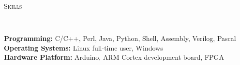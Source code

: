 \documentclass[a4paper, 12pt]{article}
\newenvironment{changemargin}[2]{%
  \begin{list}{}{%
      \setlength{\topsep}{0pt}%
      \setlength{\leftmargin}{#1}%
      \setlength{\rightmargin}{#2}%
      \setlength{\listparindent}{\parindent}%
      \setlength{\itemindent}{\parindent}%
      \setlength{\parsep}{\parskip}%
    }%
  \item[]}{\end{list}
}
\newcommand{\lineover}{
  \begin{changemargin}{-0.05in}{-0.05in}
    \vspace*{-8pt}
    \hrulefill \\
    \vspace*{-2pt}
  \end{changemargin}
}
\newcommand{\header}[1]{
  \begin{changemargin}{-0.5in}{-0.5in}
    \scshape{#1}\\
    \lineover
  \end{changemargin}
}
\newenvironment{body}
{
\vspace*{-16pt}
\begin{changemargin}{-0.25in}{-0.5in}
}	
{
\end{changemargin}
}
\begin{document}
\smallskip
\medskip
\header{Skills}
\begin{body}
  \vspace{14pt}
  \textbf{Programming:}{} C/C++, Perl, Java, Python, Shell, Assembly, Verilog, Pascal\\
  \medskip
  \textbf{Operating Systems:}{} Linux full-time user, Windows\\
  \medskip
  \textbf{Hardware Platform:}{} Arduino, ARM Cortex development board, FPGA\\
\end{body}
\end{document}
